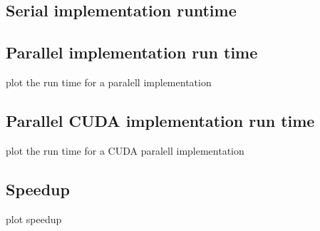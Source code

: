 \documentclass{article}
\begin{document}
\subsection{Serial implementation runtime}

\subsection{Parallel implementation run time}
plot the run time for a paralell implementation

\subsection{Parallel CUDA implementation run time}
plot the run time for a CUDA paralell implementation

\subsection{Speedup}
plot speedup
\end{document}
